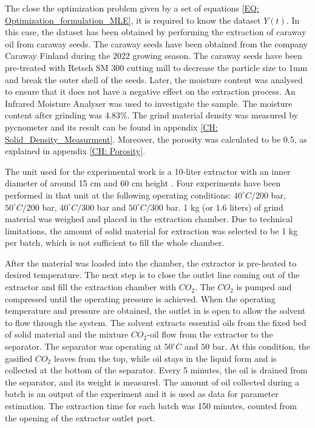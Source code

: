 \documentclass[../Article_Model_Parameters.tex]{subfiles}
\begin{document}
	
	\label{CH: Experiments}
	
	The close the optimization problem given by a set of equations \ref{EQ: Optimization_formulation_MLE}, it is required to know the dataset $Y(t)$. In this case, the dataset has been obtained by performing the extraction of caraway oil from caraway seeds. The caraway seeds have been obtained from the company Caraway Finland during the 2022 growing season. The caraway seeds have been pre-treated with Retsch SM 300 cutting mill to decrease the particle size to 1mm and break the outer shell of the seeds. Later, the moisture content was analysed to ensure that it does not have a negative effect on the extraction process. An Infrared Moisture Analyser was used to investigate the sample. The moisture content after grinding was 4.83\%. The grind material density was measured by pycnometer and its result can be found in appendix \ref{CH: Solid_Density_Measurment}. Moreover, the porosity was calculated to be 0.5, as explained in appendix \ref{CH: Porosity}.
	
	The unit used for the experimental work is a 10-liter extractor  with an inner diameter of around 15 cm and 60 cm height . Four experiments have been performed in that unit at the following operating conditions: $40^\circ C / 200$ bar, $50^\circ C / 200$ bar, $40^\circ C / 300$ bar and $50^\circ C / 300$ bar. 1 kg (or 1.6 liters) of grind material was weighed and placed in the extraction chamber. Due to technical limitations, the amount of solid material for extraction was selected to be 1 kg per batch, which is not sufficient to fill the whole chamber.
	
	After the material was loaded into the chamber, the extractor is pre-heated to desired temperature. The next step is to close the outlet line coming out of the extractor and fill the extraction chamber with $CO_2$. The $CO_2$ is pumped and compressed until the operating pressure is achieved. When the operating temperature and pressure are obtained, the outlet in is open to allow the solvent to flow through the system. The solvent extracts essential oils from the fixed bed of solid material and the mixture $CO_2$-oil flow from the extractor to the separator. The separator was operating at $50^\circ C$ and $50$ bar. At this condition, the gasified $CO_2$ leaves from the top, while oil stays in the liquid form and is collected at the bottom of the separator. Every 5 minutes, the oil is drained from the separator, and its weight is measured. The amount of oil collected during a batch is an output of the experiment and it is used as data for parameter estimation. The extraction time for each batch was 150 minutes, counted from the opening of the extractor outlet port.
	
\end{document}
